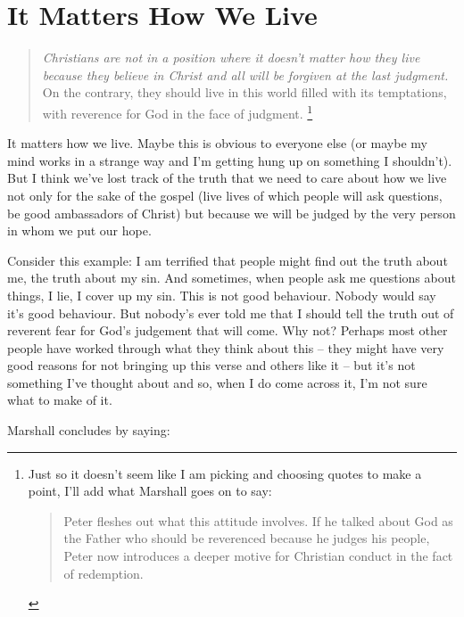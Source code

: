 \section{It Matters How We Live}

\begin{quote}
    \emph{Christians are not in a position where it doesn't matter how they live
    because they believe in Christ and all will be forgiven at the last
    judgment.} On the contrary, they should live in this world filled with its
    temptations, with reverence for God in the face of judgment.
    \autocite[Fear and Faith, emphasis mine]{marshall:1991}\footnote{%
        Just so it doesn't seem like I am picking and choosing quotes to make a
        point, I'll add what Marshall goes on to say:

        \begin{quote}
            Peter fleshes out what this attitude involves. If he talked about
            God as the Father who should be reverenced because he judges his
            people, Peter now introduces a deeper motive for Christian conduct
            in the fact of redemption.
            \autocite[Fear and Faith]{marshall:1991}
        \end{quote}
    }
\end{quote}

It matters how we live. Maybe this is obvious to everyone else (or maybe my mind
works in a strange way and I'm getting hung up on something I shouldn't). But I
think we've lost track of the truth that we need to care about how we live not
only for the sake of the gospel (live lives of which people will ask questions,
be good ambassadors of Christ) but because we will be judged by the very person
in whom we put our hope.

Consider this example: I am terrified that people might find out the truth about
me, the truth about my sin. And sometimes, when people ask me questions about
things, I lie, I cover up my sin. This is not good behaviour. Nobody would say
it's good behaviour. But nobody's ever told me that I should tell the truth out
of reverent fear for God's judgement that will come. Why not? Perhaps most other
people have worked through what they think about this -- they might have very
good reasons for not bringing up this verse and others like it -- but it's not
something I've thought about and so, when I do come across it, I'm not sure what
to make of it.

Marshall concludes by saying:

